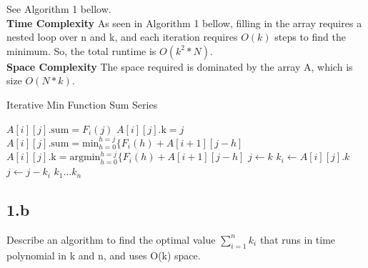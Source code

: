 \documentclass[11pt]{article}
\begin{document}
\begin{solution}
See Algorithm 1 bellow. \\

\textbf{Time Complexity}
As seen in Algorithm 1 bellow, filling in the array requires a nested loop over n and k, and each iteration requires $O(k)$ steps to find the minimum. So, the total runtime is $O(k^2*N)$. \\
\textbf{Space Complexity}
The space required is dominated by the array A, which is size $O(N*k)$.
\begin{algorithm}
\caption{Iterative Min Function Sum Series}
\begin{algorithmic}
\STATE $A[i][j].\text{sum} = F_i(j)$
\STATE $A[i][j].\text{k} = j$
\ELSE
\STATE $A[i][j].\text{sum} = \text{min}_{h=0}^{h=j} \{ F_i(h) + A[i+1][j-h]$
\STATE $A[i][j].\text{k} = \text{argmin}_{h=0}^{h=j} \{ F_i(h) + A[i+1][j-h]$
\ENDIF
\ENDFOR
\ENDFOR
\STATE $j \gets k$
\STATE $k_i \gets A[i][j].k$
\STATE $j \gets j - k_i$
\ENDFOR
\RETURN $k_1...k_n$
\end{algorithmic}
\end{algorithm} 
\end{solution}

\clearpage



\subsection *{1.b} Describe an algorithm to find the optimal value $\sum_{i=1}^{n} k_i$ that runs in time polynomial in k and n, and uses O(k) space. 
\end{document}

